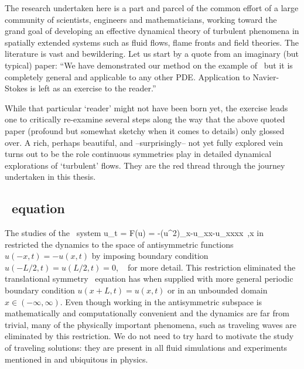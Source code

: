 The research undertaken here is a part and parcel of the
common effort of a large community of scientists, engineers and
mathematicians, working toward the grand goal of developing an effective
dynamical theory of turbulent phenomena in spatially extended systems
such as fluid flows, flame fronts and field theories.
The literature is vast and bewildering. Let us start by a
quote from an imaginary (but typical) paper: ``We have
demonstrated our method on the example of \KSe\ but it is completely
general and applicable to any other PDE. Application to
Navier-Stokes is left as an exercise to the reader.''

While that particular `reader' might not have been born yet,
the exercise leads one to critically re-examine several steps along the way that
the above quoted paper (profound but somewhat sketchy when it comes to details) only glossed over.
A rich, perhaps beautiful, and --surprisingly--  not yet fully explored
vein turns out to be the role continuous symmetries play in detailed dynamical explorations
of `turbulent' flows. They are the red thread through the journey undertaken in this thesis.


\subsection{\KS\ equation}

The studies of the \KS\ system
\beq
  u_t = F(u) = -{\textstyle{}}(u^2)_x-u_{xx}-u_{xxxx}
    \,,\qquad   x \in [-L/2,L/2]
in  restricted the dynamics
to the space of antisymmetric functions $u(-x,t)=-u(x,t)$ by imposing
boundary condition $u(-L/2,t)=u(L/2,t)=0$, \cf\  for more
detail. This restriction eliminated the translational symmetry \KS\ equation
has when supplied with more general periodic boundary condition $u(x+L,t)=u(x,t)$ or
in an unbounded domain $x\in(-\infty,\infty)$. Even though working in the antisymmetric
subspace is mathematically and computationally convenient and the dynamics are far
from trivial, many of the physically important phenomena,
such as traveling waves are eliminated by this restriction.
We do not need to try hard to motivate the
study of traveling solutions: they are present in all fluid simulations and experiments
mentioned in  and ubiquitous in physics.

